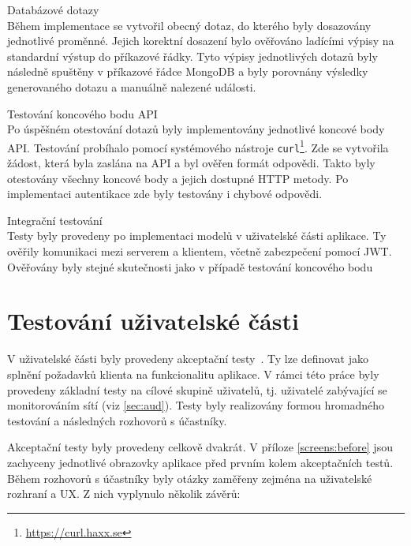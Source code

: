 \begin{description}
    \item Databázové dotazy\\
        Během implementace se vytvořil obecný dotaz, do kterého byly dosazovány jednotlivé proměnné. Jejich korektní dosazení bylo ověřováno ladícími výpisy na standardní výstup do příkazové řádky. Tyto výpisy jednotlivých dotazů byly následně spuštěny v příkazové řádce MongoDB a byly porovnány výsledky generovaného dotazu a manuálně nalezené události.

    \item Testování koncového bodu API\\
        Po úspěšném otestování dotazů byly implementovány jednotlivé koncové body API. Testování probíhalo pomocí systémového nástroje \texttt{curl}\footnote{\url{https://curl.haxx.se}}. Zde se vytvořila žádost, která byla zaslána na API a byl ověřen formát odpovědi. Takto byly otestovány všechny koncové body a jejich dostupné HTTP metody. Po implementaci autentikace zde byly testovány i chybové odpovědi.

    \item Integrační testování\\
        Testy byly provedeny po implementaci modelů v uživatelské části aplikace. Ty ověřily komunikaci mezi serverem a klientem, včetně zabezpečení pomocí JWT. Ověřovány byly stejné skutečnosti jako v případě testování koncového bodu

\end{description}

\section{Testování uživatelské části}

V uživatelské části byly provedeny akceptační testy~\cite{acp:tests}. Ty lze definovat jako splnění požadavků klienta na funkcionalitu aplikace. V rámci této práce byly provedeny základní testy na cílové skupině uživatelů, tj. uživatelé zabývající se monitorováním sítí (viz \ref{sec:aud}). Testy byly realizovány formou hromadného testování a následných rozhovorů s účastníky.

Akceptační testy byly provedeny celkově dvakrát. V příloze \ref{screens:before} jsou zachyceny jednotlivé obrazovky aplikace před prvním kolem akceptačních testů. Během rozhovorů s účastníky byly otázky zaměřeny zejména na uživatelské rozhraní a UX. Z nich vyplynulo několik závěrů:

